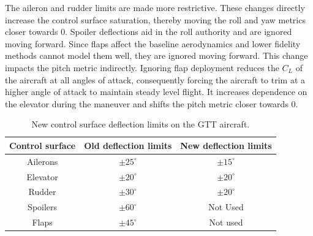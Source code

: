 The aileron and rudder limits are made more restrictive. 
These changes directly increase the control surface saturation, thereby moving the roll and yaw metrics closer towards $0$.
Spoiler deflections aid in the roll authority and are ignored moving forward.
Since flaps affect the baseline aerodynamics and lower fidelity methods cannot model them well, they are ignored moving forward. 
This change impacts the pitch metric indirectly. 
Ignoring flap deployment reduces the $C_L$ of the aircraft at all angles of attack, consequently forcing the aircraft to trim at a higher angle of attack to maintain steady level flight. 
It increases dependence on the elevator during the maneuver and shifts the pitch metric closer towards $0$.

\begin{table}
\centering
    \renewcommand{\arraystretch}{1.2}
    \captionsetup{justification=centering}
    \caption{New control surface deflection limits on the GTT aircraft.} 
    \begin{tabular}{|c|c|c|}
    \hline
        Control surface & Old deflection limits & New deflection limits \\ \hline
        Ailerons & $\pm 25^\circ$ & $\pm 15^\circ$ \\ \hline
        Elevator & $\pm 20^\circ$ & $\pm 20^\circ$ \\ \hline
        Rudder & $\pm 30^\circ$ & $\pm 20^\circ$   \\ \hline
        Spoilers & $\pm 60^\circ$ & Not Used       \\ \hline
        Flaps & $\pm 45^\circ$ & Not used          \\ \hline
    \end{tabular}
    \label{tab:gtt_defl_limits_new}
\end{table}